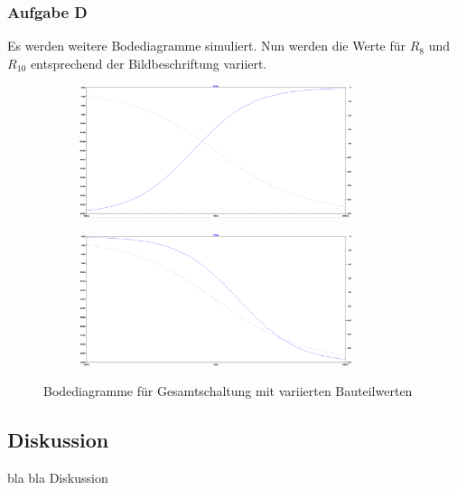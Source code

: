 \subsubsection{Aufgabe D}
Es werden weitere Bodediagramme simuliert. Nun werden die Werte für $R_{8}$ und $R_{10}$ entsprechend der Bildbeschriftung variiert.
\begin{figure}[h]
\centering
\begin{subfigure}{.5\textwidth}
  \centering
  \includegraphics[width=8cm]{pics/10_90}
  \label{Bode1090}
\end{subfigure}%
\begin{subfigure}{.5\textwidth}
  \centering
  \includegraphics[width=8cm]{pics/90_10}
  \label{Bode9010}
\end{subfigure}
\caption{Bodediagramme für Gesamtschaltung mit variierten Bauteilwerten}
\end{figure}





\subsection{Diskussion}
bla bla Diskussion


